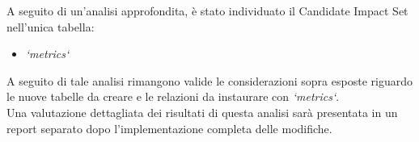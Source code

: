 A seguito di un'analisi approfondita, è stato individuato il Candidate Impact Set nell'unica tabella: 
\begin{itemize}
\item \textit{`metrics`}
\end{itemize}
A seguito di tale analisi rimangono valide le considerazioni sopra esposte riguardo le nuove tabelle da creare e le relazioni da instaurare con \textit{`metrics`}.
\\

Una valutazione dettagliata dei risultati di questa analisi sarà presentata in un report separato dopo l'implementazione completa delle modifiche.